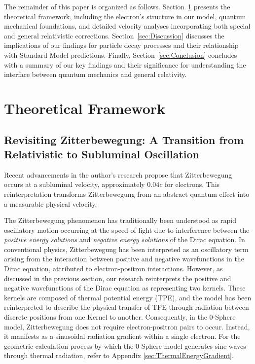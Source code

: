 \documentclass[%
 reprint,
 amsmath,amssymb,
 aps,
]{revtex4-1}
\numberwithin{equation}{section}%
\begin{document}
The remainder of this paper is organized as follows. Section~\ref{sec:TheoreticalFramework} presents the theoretical framework, including the electron's structure in our model, quantum mechanical foundations, and detailed velocity analyses incorporating both special and general relativistic corrections. Section~\ref{sec:Discussion} discusses the implications of our findings for particle decay processes and their relationship with Standard Model predictions. Finally, Section~\ref{sec:Conclusion} concludes with a summary of our key findings and their significance for understanding the interface between quantum mechanics and general relativity.


\clearpage


\section{Theoretical Framework}
\label{sec:TheoreticalFramework}


\subsection{Revisiting Zitterbewegung: A Transition from Relativistic to Subluminal Oscillation}
\label{sec:RevisitingZitterbewegung}

Recent advancements in the author's research propose that Zitterbewegung occurs at a subluminal velocity, approximately $0.04c$ for electrons. This reinterpretation transforms Zitterbewegung from an abstract quantum effect into a measurable physical velocity.

The Zitterbewegung phenomenon has traditionally been understood as rapid oscillatory motion occurring at the speed of light due to interference between the \textit{positive energy solutions} and \textit{negative energy solutions} of the Dirac equation. In conventional physics, Zitterbewegung has been interpreted as an oscillatory term arising from the interaction between positive and negative wavefunctions in the Dirac equation, attributed to electron-positron interactions. However, as discussed in the previous section, our research reinterprets the positive and negative wavefunctions of the Dirac equation as representing two kernels. These kernels are composed of thermal potential energy (TPE), and the model has been reinterpreted to describe the physical transfer of TPE through radiation between discrete positions from one Kernel to another.
Consequently, in the 0-Sphere model, Zitterbewegung does not require electron-positron pairs to occur. Instead, it manifests as a sinusoidal radiation gradient within a single electron. For the geometric calculation process by which the 0-Sphere model generates sine waves through thermal radiation, refer to Appendix \ref{sec:ThermalEnergyGradient}.
\end{document}

